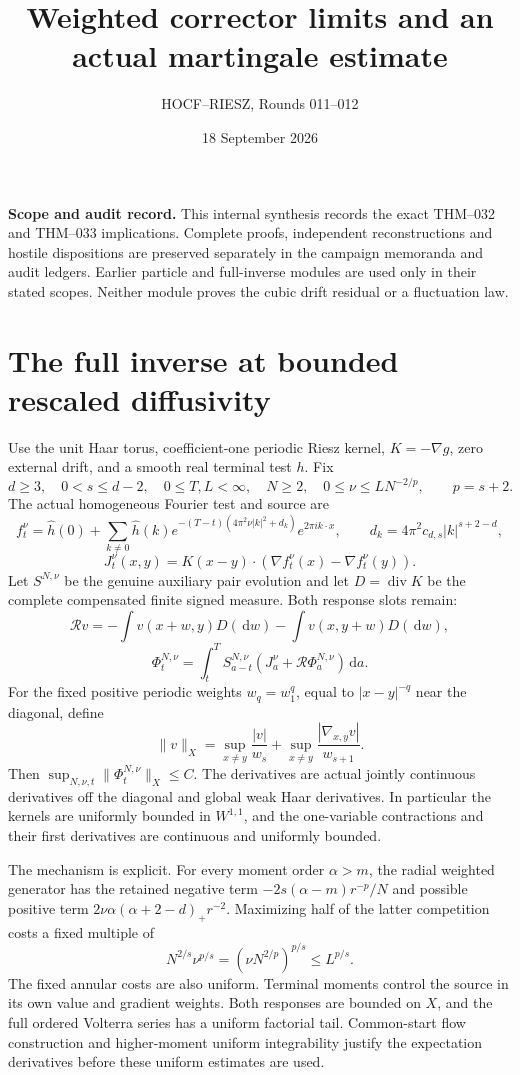 \documentclass[10pt]{article}
\title{Weighted corrector limits and an actual martingale estimate}
\author{HOCF--RIESZ, Rounds 011--012}
\date{18 September 2026}
\newcommand{\dd}{\,\mathrm d}
\newcommand{\R}{\mathcal R}
\begin{document}
\maketitle
\noindent\textbf{Scope and audit record.}
This internal synthesis records the exact THM--032 and THM--033 implications.
Complete proofs, independent reconstructions and hostile dispositions are
preserved separately in the campaign memoranda and audit ledgers. Earlier
particle and full-inverse modules are used only in their stated scopes.
Neither module proves the cubic drift residual or a fluctuation law.

\section*{The full inverse at bounded rescaled diffusivity}
Use the unit Haar torus, coefficient-one periodic Riesz kernel, $K=-\nabla g$,
zero external drift, and a smooth real terminal test $h$. Fix
\[
 d\ge3,\quad 0<s\le d-2,\quad 0\le T,L<\infty,\quad N\ge2,\quad
 0\le\nu\le L N^{-2/p},\qquad p=s+2.
\]
The actual homogeneous Fourier test and source are
\[
 f_t^\nu=\widehat h(0)+\sum_{k\ne0}\widehat h(k)
 e^{-(T-t)(4\pi^2\nu|k|^2+d_k)}e^{2\pi i k\cdot x},\qquad
 d_k=4\pi^2c_{d,s}|k|^{s+2-d},
\]
\[
 J_t^\nu(x,y)=K(x-y)\cdot(\nabla f_t^\nu(x)-\nabla f_t^\nu(y)).
\]
Let $S^{N,\nu}$ be the genuine auxiliary pair evolution and let
$D=\operatorname{div}K$ be the complete compensated finite signed measure.
Both response slots remain:
\[
 \R v=-\int v(x+w,y)D(\dd w)-\int v(x,y+w)D(\dd w),
\]
\[
 \Phi_t^{N,\nu}=\int_t^T S_{a-t}^{N,\nu}
                 (J_a^\nu+\R\Phi_a^{N,\nu})\dd a.
\]
For the fixed positive periodic weights $w_q=w_1^q$, equal to $|x-y|^{-q}$
near the diagonal, define
\[
 \|v\|_X=\sup_{x\ne y}\frac{|v|}{w_s}
         +\sup_{x\ne y}\frac{|\nabla_{x,y}v|}{w_{s+1}}.
\]
Then $\sup_{N,\nu,t}\|\Phi_t^{N,\nu}\|_X\le C$.
The derivatives are actual jointly continuous derivatives off the diagonal
and global weak Haar derivatives. In particular the kernels are uniformly
bounded in $W^{1,1}$, and the one-variable contractions and their first
derivatives are continuous and uniformly bounded.

The mechanism is explicit. For every moment order $\alpha>m$, the radial
weighted generator has the retained negative term
$-2s(\alpha-m)r^{-p}/N$ and possible positive term
$2\nu\alpha(\alpha+2-d)_+r^{-2}$. Maximizing half of the latter competition
costs a fixed multiple of
\[
 N^{2/s}\nu^{p/s}=(\nu N^{2/p})^{p/s}\le L^{p/s}.
\]
The fixed annular costs are also uniform. Terminal moments control the
source in its own value and gradient weights. Both responses are bounded
on $X$, and the full ordered Volterra series has a uniform factorial tail.
Common-start flow construction and higher-moment uniform integrability
justify the expectation derivatives before these uniform estimates are used.
\end{document}
